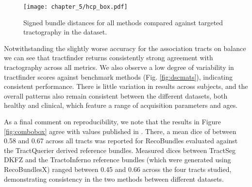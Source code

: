 \documentclass[12pt,phd,a4paper,twoside]{ucl_thesis}
\renewcommand{\textcite}[2][]{
\ifthenelse { \equal {#1} {} }  {\citeauthor{#2}\autocite{#2}}   {\citeauthor{#1}\autocite{#2}}}
\begin{document}
\begin{SCfigure}
  \texttt{[image: chapter\_5/hcp\_box.pdf]}
  \caption[Signed bundle distances to streamline tractography, HCP dataset]{Signed bundle distances for all methods compared against targeted tractography in the  dataset. }
  \label{fig:hcpbox}
\end{SCfigure}

Notwithstanding the slightly worse accuracy for the association tracts on balance we can see that tractfinder returns consistently strong agreement with tractography across all metrics.
We also observe a low degree of variability in tractfinder scores against benchmark methods (Fig. \ref{fig:dscmats}), indicating consistent performance.
There is little variation in results across subjects, and the overall patterns also remain consistent between the different datasets, both healthy and clinical, which feature a range of acquisition parameters and ages.

As a final comment on reproducibility, we note that the results in Figure \ref{fig:combobox} agree with values published in \textcite{Wasserthal2018}.
There, a mean \gls{dice} of between 0.58 and 0.67 across all tracts was reported for RecoBundles evaluated against the TractQuerier derived reference bundles.
Measured \glspl{dice} between TractSeg DKFZ and the TractoInferno reference bundles (which were generated using RecoBundlesX) ranged between 0.45 and 0.66 across the four tracts studied, demonstrating consistency in the two methods between different datasets.
\end{document}
